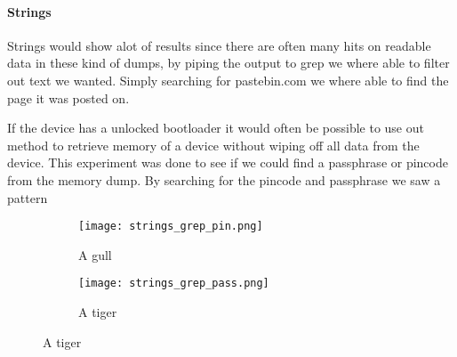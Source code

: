   \paragraph{Strings}
  Strings would show alot of results since there are often many hits on readable 
  data in these kind of dumps, by piping the output to grep we where able to 
  filter out text we wanted. Simply searching for pastebin.com we where able to 
  find the page it was posted on. 
 

If the device has a unlocked bootloader it would often be possible to use out 
method to retrieve memory of a device without wiping off all data from the 
device. This experiment was done to see if we could find a passphrase or 
pincode from the memory dump. By searching for the pincode and passphrase we saw a pattern \\


\begin{figure}
        
        \begin{subfigure}[b]{0.3\textwidth}
                \texttt{[image: strings\_grep\_pin.png]}
                \caption{A gull}
                \label{fig:gull}
        \end{subfigure}%
        \qquad \qquad \qquad \qquad \qquad %
        \begin{subfigure}[b]{0.3\textwidth}
                \texttt{[image: strings\_grep\_pass.png]}
                \caption{A tiger}
                \label{fig:tiger}
        \end{subfigure}

\end{figure}
